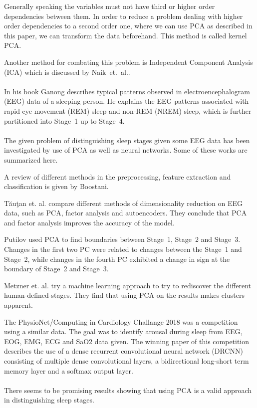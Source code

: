 \documentclass[a4paper]{IEEEtran}
\begin{document}
Generally speaking the variables must not have third or higher order dependencies between them. In order to reduce a problem dealing with higher order dependencies to a second order one, where we can use PCA as described in this paper, we can transform the data beforehand. This method is called kernel PCA\cite{Shlens2014}.

Another method for combating this problem is Independent Component Analysis (ICA) which is discussed by Naik~et.~al.\cite{Naik2011}.
\\
\\
In his book Ganong describes typical patterns observed in electroencephalogram (EEG) data of a sleeping person\cite{Ganong1997}. He explains the EEG patterns associated with rapid eye movement (REM) sleep and non-REM (NREM) sleep, which is further partitioned into Stage~1 up to Stage~4.
\\
\\
The given problem of distinguishing sleep stages given some EEG data has been investigated by use of PCA as well as neural networks. Some of these works are summarized here.

A review of different methods in the preprocessing, feature extraction and classification is given by Boostani\cite{Boostani2017}.

Tăuţan et. al.\cite{Tautan2021} compare different methods of dimensionality reduction on EEG data, such as PCA, factor analysis and autoencoders. They conclude that PCA and factor analysis improves the accuracy of the model.

Putilov\cite{Putilov2015} used PCA to find boundaries between Stage~1, Stage~2 and Stage~3. Changes in the first two PC were related to changes between the Stage~1 and Stage~2, while changes in the fourth PC exhibited a change in sign at the boundary of Stage~2 and Stage~3.

Metzner et. al.\cite{Metzner2023} try a machine learning approach to try to rediscover the different human-defined-stages. They find that using PCA on the results makes clusters apparent.

The PhysioNet/Computing in Cardiology Challange 2018 was a competition using a similar data\cite{Ghassemi2018}. The goal was to identify arousal during sleep from EEG, EOG, EMG, ECG and SaO2 data given. The winning paper of this competition describes the use of a dense recurrent convolutional neural network (DRCNN) consisting of multiple dense convolutional layers, a bidirectional long-short term memory layer and a softmax output layer\cite{Howe2018}.
\\
\\
There seems to be promising results showing that using PCA is a valid approach in distinguishing sleep stages.
\end{document}
